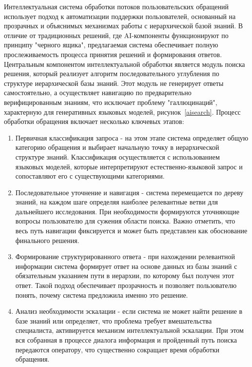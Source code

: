 Интеллектуальная система обработки потоков пользовательских обращений использует подход к автоматизации поддержки пользователей, основанный на прозрачных и объяснимых механизмах работы с иерархической базой знаний. В отличие от традиционных решений, где AI-компоненты функционируют по принципу "черного ящика", предлагаемая система обеспечивает полную прослеживаемость процесса принятия решений и формирования ответов.
Центральным компонентом интеллектуальной обработки является модуль поиска решения, который реализует алгоритм последовательного углубления по структуре иерархической базы знаний. Этот модуль не генерирует ответы самостоятельно, а осуществляет навигацию по предварительно верифицированным знаниям, что исключает проблему "галлюцинаций", характерную для генеративных языковых моделей, рисунок~\ref{aisearch}.
Процесс обработки обращения включает несколько ключевых этапов:
\begin{enumerate}[label=\arabic*.]
    \item Первичная классификация запроса - на этом этапе система определяет общую категорию обращения и выбирает начальную точку в иерархической структуре знаний. Классификация осуществляется с использованием языковых моделей, которые интерпретируют естественно-языковой запрос и сопоставляют его с существующими категориями.
    \item Последовательное уточнение и навигация - система перемещается по дереву знаний, на каждом шаге определяя наиболее релевантные ветви для дальнейшего исследования. При необходимости формируются уточняющие вопросы пользователю для сужения области поиска. Важно отметить, что весь путь навигации фиксируется и может быть представлен как обоснование финального решения.
    \item Формирование структурированного ответа - при нахождении релевантной информации система формирует ответ на основе данных из базы знаний с обязательным указанием пути в иерархии, по которому был получен этот ответ. Такой подход обеспечивает прозрачность и позволяет пользователю понять, почему система предложила именно это решение.
    \item Анализ необходимости эскалации - если система не может найти решение в базе знаний или определяет, что проблема требует вмешательства специалиста, активируется механизм интеллектуальной эскалации. При этом вся собранная в процессе диалога информация и пройденный путь поиска передаются оператору, что существенно сокращает время обработки обращения.
\end{enumerate}

